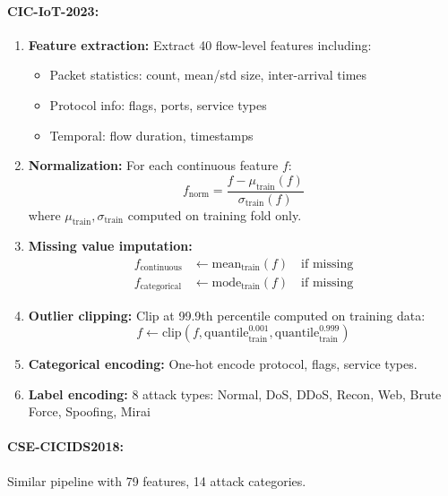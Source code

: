 \documentclass[12pt,a4paper]{article}
\theoremstyle{definition}
\begin{document}
\paragraph{CIC-IoT-2023:}
\begin{enumerate}
\item \textbf{Feature extraction:} Extract 40 flow-level features including:
\begin{itemize}
\item Packet statistics: count, mean/std size, inter-arrival times
\item Protocol info: flags, ports, service types
\item Temporal: flow duration, timestamps
\end{itemize}

\item \textbf{Normalization:} For each continuous feature $f$:
\begin{equation}
f_{\text{norm}} = \frac{f - \mu_{\text{train}}(f)}{\sigma_{\text{train}}(f)}
\end{equation}
where $\mu_{\text{train}}, \sigma_{\text{train}}$ computed on training fold only.

\item \textbf{Missing value imputation:}
\begin{align}
f_{\text{continuous}} &\gets \text{mean}_{\text{train}}(f) \quad \text{if missing} \\
f_{\text{categorical}} &\gets \text{mode}_{\text{train}}(f) \quad \text{if missing}
\end{align}

\item \textbf{Outlier clipping:} Clip at 99.9th percentile computed on training data:
\begin{equation}
f \gets \text{clip}(f, \text{quantile}_{\text{train}}^{0.001}, \text{quantile}_{\text{train}}^{0.999})
\end{equation}

\item \textbf{Categorical encoding:} One-hot encode protocol, flags, service types.

\item \textbf{Label encoding:} 8 attack types: Normal, DoS, DDoS, Recon, Web, Brute Force, Spoofing, Mirai
\end{enumerate}

\paragraph{CSE-CICIDS2018:}
Similar pipeline with 79 features, 14 attack categories.
\end{document}
